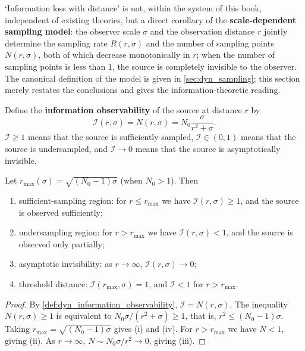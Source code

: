 \begin{remark}\label{rem:dyn_information_distance_positioning}
`Information loss with distance' is not, within the system of this book, independent of existing theories, but a direct corollary of the \textbf{scale-dependent sampling model}: the observer scale $\sigma$ and the observation distance $r$ jointly determine the sampling rate $R(r,\sigma)$ and the number of sampling points $N(r,\sigma)$, both of which decrease monotonically in $r$; when the number of sampling points is less than $1$, the source is completely invisible to the observer. The canonical definition of the model is given in \cref{sec:dyn_sampling}; this section merely restates the conclusions and gives the information-theoretic reading.
\end{remark}

\begin{definition}\label{def:dyn_information_observability}
Define the \textbf{information observability} of the source at distance $r$ by
\[
\mathcal I(r,\sigma)=N(r,\sigma)=N_0\frac{\sigma}{r^2+\sigma}.
\]
$\mathcal I\ge 1$ means that the source is sufficiently sampled, $\mathcal I\in(0,1)$ means that the source is undersampled, and $\mathcal I\to 0$ means that the source is asymptotically invisible.
\end{definition}

\begin{theorem}\label{thm:dyn_information_distance_decay}
Let $r_{\max}(\sigma)=\sqrt{(N_0-1)\sigma}$ (when $N_0>1$). Then
\begin{enumerate}[label=(\roman*)]
    \item sufficient-sampling region: for $r\le r_{\max}$ we have $\mathcal I(r,\sigma)\ge 1$, and the source is observed sufficiently;
    \item undersampling region: for $r>r_{\max}$ we have $\mathcal I(r,\sigma)<1$, and the source is observed only partially;
    \item asymptotic invisibility: as $r\to\infty$, $\mathcal I(r,\sigma)\to 0$;
    \item threshold distance: $\mathcal I(r_{\max},\sigma)=1$, and $\mathcal I<1$ for $r>r_{\max}$.
\end{enumerate}
\end{theorem}

\begin{proof}
By \cref{def:dyn_information_observability}, $\mathcal I=N(r,\sigma)$. The inequality $N(r,\sigma)\ge 1$ is equivalent to $N_0\sigma/(r^2+\sigma)\ge 1$, that is, $r^2\le (N_0-1)\sigma$. Taking $r_{\max}=\sqrt{(N_0-1)\sigma}$ gives (i) and (iv). For $r>r_{\max}$ we have $N<1$, giving (ii). As $r\to\infty$, $N\sim N_0\sigma/r^2\to 0$, giving (iii).
\end{proof}

